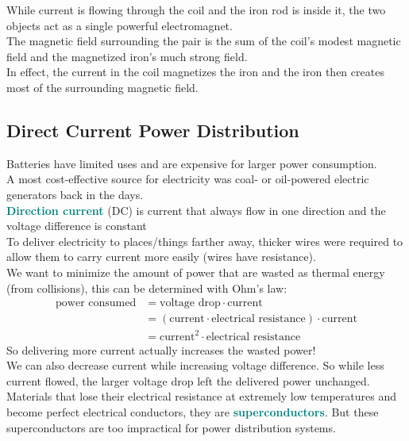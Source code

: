 \documentclass[12pt]{article}
\theoremstyle{definition}
\newcommand{\defnterm}[1]{\textbf{\textcolor{teal}{#1}}\index{#1}}
\begin{document}
While current is flowing through the coil and the iron rod is inside it, the two objects act as a single powerful electromagnet. \\
The magnetic field surrounding the pair is the sum of the coil's modest magnetic field and the magnetized iron's much strong field. \\
In effect, the current in the coil magnetizes the iron and the iron then creates most of the surrounding magnetic field.

\subsection{Direct Current Power Distribution}
Batteries have limited uses and are expensive for larger power consumption. \\
A most cost-effective source for electricity was coal- or oil-powered electric generators back in the days. \\

\defnterm{Direction current} (DC) is current that always flow in one direction and the voltage difference is constant \\

To deliver electricity to places/things farther away, thicker wires were required to allow them to carry current more easily (wires have resistance). \\
We want to minimize the amount of power that are wasted as thermal energy (from collisions), this can be determined with Ohm's law:
\begin{align*}
\text{power consumed} &= \text{voltage drop} \cdot \text{current} \\
&= (\text{current} \cdot \text{electrical resistance}) \cdot \text{current} \\
&= \text{current}^{2} \cdot \text{electrical resistance}
\end{align*}
So delivering more current actually increases the wasted power! \\

We can also decrease current while increasing voltage difference.
So while less current flowed, the larger voltage drop left the delivered power unchanged. \\

Materials that lose their electrical resistance at extremely low temperatures and become perfect electrical conductors, they are \defnterm{superconductors}.
But these superconductors are too impractical for power distribution systems.
\end{document}
